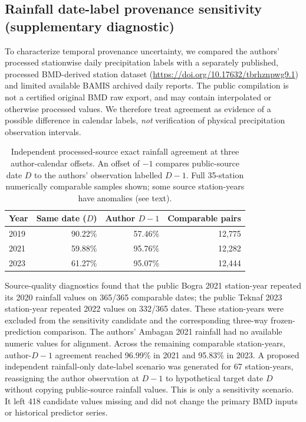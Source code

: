 
\subsection{Rainfall date-label provenance sensitivity (supplementary diagnostic)}
To characterize temporal provenance uncertainty, we compared the authors'
processed stationwise daily precipitation labels with a separately published,
processed BMD-derived station dataset
(\url{https://doi.org/10.17632/tbrhznpwg9.1}) and limited available
BAMIS archived daily reports. The public compilation is not a certified
original BMD raw export, and may contain interpolated or otherwise processed
values. We therefore treat agreement as evidence of a possible difference
in calendar labels, \emph{not} verification of physical precipitation
observation intervals.

\begin{table}[t]
\centering
\caption{Independent processed-source exact rainfall agreement at three
author-calendar offsets. An offset of $-1$ compares public-source date $D$
to the authors' observation labelled $D-1$. Full 35-station numerically
comparable samples shown; some source station-years have anomalies (see text).}
\label{tab:supp_public_rain_timing}
\begin{tabular}{lrrr}
\hline
Year & Same date ($D$) & Author $D-1$ & Comparable pairs \\
\hline
2019 & 90.22\% & 57.46\% & 12,775 \\
2021 & 59.88\% & 95.76\% & 12,282 \\
2023 & 61.27\% & 95.07\% & 12,444 \\
\hline
\end{tabular}
\end{table}

Source-quality diagnostics found that the public Bogra 2021 station-year
repeated its 2020 rainfall values on 365/365 comparable dates; the public
Teknaf 2023 station-year repeated 2022 values on 332/365 dates. These
station-years were excluded from the sensitivity candidate and the
corresponding three-way frozen-prediction comparison. The authors'
Ambagan 2021 rainfall had no available numeric values for alignment.
Across the remaining comparable station-years, author-$D-1$ agreement
reached 96.99\% in 2021 and 95.83\% in 2023. A proposed independent
rainfall-only date-label scenario was generated for 67 station-years,
reassigning the author observation at $D-1$ to hypothetical target
date $D$ without copying public-source rainfall values. This is only
a sensitivity scenario. It left 418 candidate values missing and did not
change the primary BMD inputs or historical predictor series.


